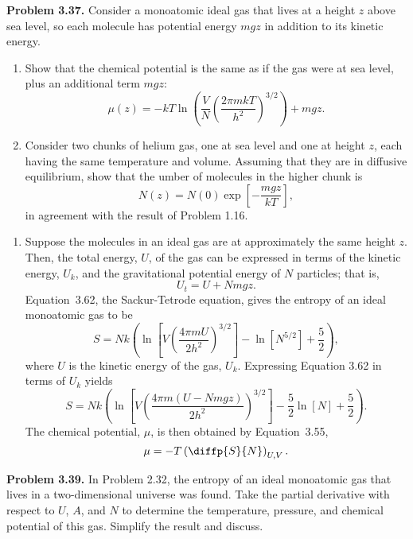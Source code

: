 \documentclass[a4paper, 12pt]{config/homework}
\begin{document}
\pagebreak
\noindent
\textbf{Problem 3.37.} Consider a monoatomic ideal gas that lives at a height \(z\) above sea level, so each molecule has potential energy \(mgz\) in addition to its kinetic energy.
\begin{enumerate}[label=\textbf{(\alph*)}]
\item Show that the chemical potential is the same as if the gas were at sea level, plus an additional term \(mgz\):
\[\mu(z) = - kT\ln\left(\frac{V}{N}\left(\frac{2\pi m k T}{h^2}\right)^{3/2}\right) + mgz.\]
\item Consider two chunks of helium gas, one at sea level and one at height \(z\), each having the same temperature and volume. Assuming that they are in diffusive equilibrium, show that the umber of molecules in the higher chunk is
\[N(z) = N(0)\exp\left[-\frac{mgz}{kT}\right],\]
in agreement with the result of Problem 1.16.
\end{enumerate}
\bigskip
\begin{enumerate}[label=\textbf{(\alph*)}]
\item Suppose the molecules in an ideal gas are at approximately the same height \(z\). Then, the total energy, \(U\), of the gas can be expressed in terms of the kinetic energy, \(U_k\), and the gravitational potential energy of \(N\) particles; that is,
\[U_t = U + Nmgz.\]
Equation~3.62, the Sackur-Tetrode equation, gives the entropy of an ideal monoatomic gas to be
\[S = Nk\left(\ln\left[V\left(\frac{4\pi m U}{2h^2}\right)^{3/2}\right] - \ln\left[N^{5/2}\right]+\frac{5}{2}\right),\]
where \(U\) is the kinetic energy of the gas, \(U_k\). Expressing Equation 3.62 in terms of \(U_k\) yields
\[S = Nk\left(\ln\left[V\left(\frac{4\pi m \left(U - Nmgz\right)}{2h^2}\right)^{3/2}\right] - \frac{5}{2}\ln\left[N\right]+\frac{5}{2}\right).\]
The chemical potential, \(\mu\), is then obtained by Equation~3.55,
\[\mu = -T\left(\diffp{S}{N}\right)_{U,V}.\]

\end{enumerate}

\pagebreak
\noindent
\textbf{Problem 3.39.} In Problem 2.32, the entropy of an ideal monoatomic gas that lives in a two-dimensional universe was found. Take the partial derivative with respect to \(U\), \(A\), and \(N\) to determine the temperature, pressure, and chemical potential of this gas. Simplify the result and discuss.
\end{document}
